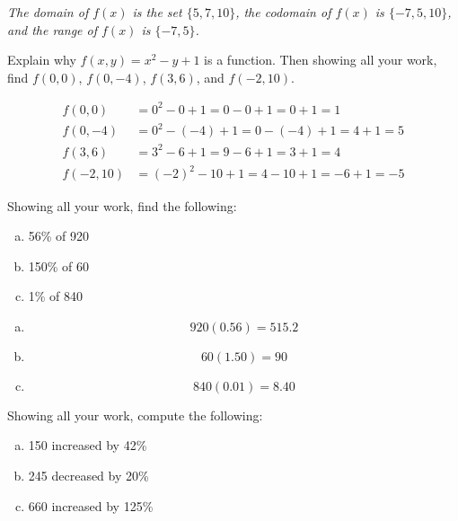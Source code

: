 \documentclass[12pt,letterpaper]{exam}
\begin{document}
\begin{questions}
{\itshape The domain of $f(x)$ is the set $\{ 5, 7, 10 \}$, the codomain of $f(x)$ is $\{ -7, 5, 10 \}$, and the range of $f(x)$ is $\{ -7, 5 \}$.}



\newpage
\question[10] Explain why $f(x, y)= x^2 - y + 1$ is a function. Then showing all your work, find $f(0, 0)$, $f(0, -4)$, $f(3, 6)$, and $f(-2, 10)$. \pspace

 \pspace
	\[
	\begin{aligned}
	f(0, 0)&= 0^2 - 0 + 1= 0 - 0 + 1= 0 + 1= 1 \\[0.3cm]
	f(0, -4)&= 0^2 - (-4) + 1= 0 - (-4) + 1= 4 + 1= 5 \\[0.3cm]
	f(3, 6)&= 3^2 - 6 + 1= 9 - 6 + 1= 3 + 1= 4 \\[0.3cm]
	f(-2, 10)&= (-2)^2 - 10 + 1= 4 - 10 + 1= -6 + 1= -5
	\end{aligned}
	\]



\newpage
\question[10] Showing all your work, find the following:
	\begin{enumerate}[(a)]
	\item 56\% of 920
	\item 150\% of 60
	\item 1\% of 840
	\end{enumerate} \pspace

\sol 
\begin{enumerate}[(a)]
\item 
	\[
	920(0.56)= 515.2
	\] \pspace

\item 
	\[
	60(1.50)= 90
	\] \pspace

\item 
	\[
	840(0.01)= 8.40
	\]
\end{enumerate}



\newpage
\question[10] Showing all your work, compute the following:
	\begin{enumerate}[(a)]
	\item 150 increased by 42\%
	\item 245 decreased by 20\%
	\item 660 increased by 125\%
	\end{enumerate} \pspace


\end{questions}
\end{document}
